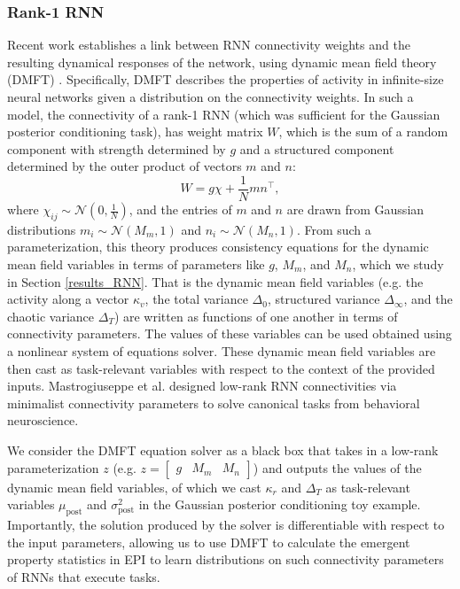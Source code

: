 \documentclass[11pt]{article}
\begin{document}
\subsubsection{Rank-1 RNN}\label{methods_LRRNN}
Recent work establishes a link between RNN connectivity weights and the resulting dynamical responses of the network, using dynamic mean field theory (DMFT) \cite{mastrogiuseppe2018linking}.
Specifically, DMFT describes the properties of activity in infinite-size neural networks given a distribution on the connectivity weights.
In such a model, the connectivity of a rank-1 RNN (which was sufficient for the Gaussian posterior conditioning task), has weight matrix $W$, which is the sum of a random component with strength determined by $g$ and a structured component determined by the outer product of vectors $m$ and $n$:
\begin{equation}
W = g\chi + \frac{1}{N}mn^\top,
\end{equation}
where  $\chi_{ij} \sim \mathcal{N}(0, \frac{1}{N})$, and the entries of $m$ and $n$ are drawn from Gaussian distributions $m_i \sim \mathcal{N}(M_m, 1)$ and $n_i \sim \mathcal{N}(M_n, 1)$. From such a parameterization, this theory produces consistency equations for the dynamic mean field variables in terms of parameters like $g$, $M_m$, and $M_n$, which we study in Section \ref{results_RNN}.  That is the dynamic mean field variables (e.g. the activity along a vector $\kappa_v$, the total variance $\Delta_0$, structured variance $\Delta_\infty$, and the chaotic variance $\Delta_T$) are written as functions of one another in terms of connectivity parameters.  The values of these variables can be used obtained using a nonlinear system of equations solver.  These dynamic mean field variables are then cast as task-relevant variables with respect to the context of the provided inputs. Mastrogiuseppe et al. designed low-rank RNN connectivities via minimalist connectivity parameters to solve canonical tasks from behavioral neuroscience. 

We consider the DMFT equation solver as a black box that takes in a low-rank parameterization $z$ (e.g. $z = \begin{bmatrix} g & M_m & M_n \end{bmatrix}$)  and outputs the values of the dynamic mean field variables, of which we cast $\kappa_r$ and $\Delta_T$ as task-relevant variables $\mu_{\text{post}}$ and $\sigma^2_{\text{post}}$ in the Gaussian posterior conditioning toy example.
Importantly, the solution produced by the solver is differentiable with respect to the input parameters, allowing us to use DMFT to calculate the emergent property statistics in EPI to learn distributions on such connectivity parameters of RNNs that execute tasks.
\end{document}
